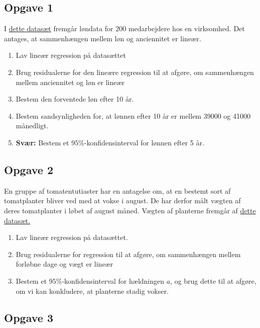 
\subsection*{Opgave 1}
I \href{https://github.com/ChristianJLex/TeachingNotes/raw/master/2023-2024/Data og lign/Loendata.xlsx}{\color{blue!60} dette datasæt} fremgår løndata for 200 medarbejdere hos en virksomhed. Det antages, at sammenhængen mellem løn og anciennitet er lineær.

\begin{enumerate}[label=\roman*)]
	\item Lav lineær regression på datasættet
	\item Brug residualerne for den lineære regression til at afgøre, om sammenhængen mellem anciennitet og løn er 
	lineær
	\item Bestem den forventede løn efter 10 år.
	\item Bestem sandsynligheden for, at lønnen efter 10 år er mellem 39000 og 41000 månedligt.
	\item \textbf{Svær:} Bestem et $95\%$-konfidensinterval for lønnen efter 5 år.
\end{enumerate}  

\subsection*{Opgave 2}

En gruppe af tomatentutiaster har en antagelse om, at en bestemt sort af tomatplanter bliver ved med at vokse i august. De har derfor målt vægten af deres tomatplanter i løbet af august måned. Vægten af planterne fremgår af \href{https://github.com/ChristianJLex/TeachingNotes/raw/master/2023-2024/Data og lign/TomatVaegt.xlsx}{\color{blue!60} dette datasæt.}

\begin{enumerate}[label=\roman*)]
	\item Lav lineær regression på datasættet.
	\item Brug residualerne for regression til at afgøre, om sammenhængen mellem forløbne dage og vægt er lineær
	\item Bestem et $95\%$-konfidensinterval for hældningen $a$, og brug dette til at afgøre, om vi kan konkludere, at 
	planterne stadig vokser.
\end{enumerate}

\subsection*{Opgave 3}


